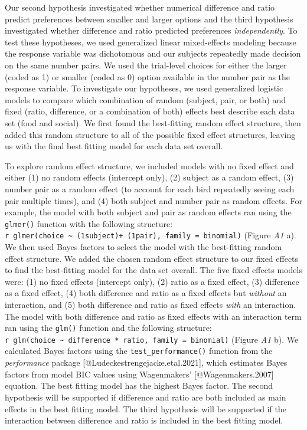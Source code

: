 \documentclass[
]{article}
\begin{document}
Our second hypothesis investigated whether numerical difference and
ratio predict preferences between smaller and larger options and the
third hypothesis investigated whether difference and ratio predicted
preferences \emph{independently}. To test these hypotheses, we used
generalized linear mixed-effects modeling because the response variable
was dichotomous and our subjects repeatedly made decision on the same
number pairs. We used the trial-level choices for either the larger
(coded as 1) or smaller (coded as 0) option available in the number pair
as the response variable. To investigate our hypotheses, we used
generalized logistic models to compare which combination of random
(subject, pair, or both) and fixed (ratio, difference, or a combination
of both) effects best describe each data set (food and social). We first
found the best-fitting random effect structure, then added this random
structure to all of the possible fixed effect structures, leaving us
with the final best fitting model for each data set overall.

To explore random effect structure, we included models with no fixed
effect and either (1) no random effects (intercept only), (2) subject as
a random effect, (3) number pair as a random effect (to account for each
bird repeatedly seeing each pair multiple times), and (4) both subject
and number pair as random effects. For example, the model with both
subject and pair as random effects ran using the \texttt{glmer()}
function with the following structure:
\texttt{r\ glmer(choice\ \textasciitilde{}\ (1\textbar{}subject)+\ (1\textbar{}pair),\ family\ =\ binomial)}
(Figure \emph{A1} a). We then used Bayes factors to select the model
with the best-fitting random effect structure. We added the chosen
random effect structure to our fixed effects to find the best-fitting
model for the data set overall. The five fixed effects models were: (1)
no fixed effects (intercept only), (2) ratio as a fixed effect, (3)
difference as a fixed effect, (4) both difference and ratio as a fixed
effects but \emph{without} an interaction, and (5) both difference and
ratio as fixed effects \emph{with} an interaction. The model with both
difference and ratio as fixed effects with an interaction term ran using
the \texttt{glm()} function and the following structure:
\texttt{r\ glm(choice\ \textasciitilde{}\ difference\ *\ ratio,\ family\ =\ binomial)}
(Figure \emph{A1} b). We calculated Bayes factors using the
\texttt{test\_performance()} function from the \emph{performance}
package {[}@Ludeckestrengejacke.etal.2021{]}, which estimates Bayes
factors from model BIC values using Wagenmakers' {[}@Wagenmakers.2007{]}
equation. The best fitting model has the highest Bayes factor. The
second hypothesis will be supported if difference and ratio are both
included as main effects in the best fitting model. The third hypothesis
will be supported if the interaction between difference and ratio is
included in the best fitting model.
\end{document}
